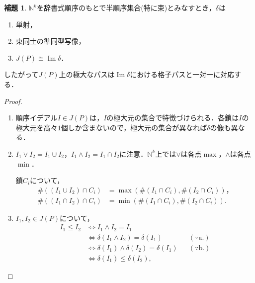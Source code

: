 \documentclass[xelatex,ja=standard,a4paper,14pt,everyparhook=compat]{bxjsarticle}
\newcommand{\bbN}{\mathbb{N}}
\DeclareMathOperator{\image}{Im}
\theoremstyle{definition}
\newtheorem*{lemma*}{補題}
\begin{document}
\begin{lemma*}
    $\bbN^k$を辞書式順序のもとで半順序集合(特に束)とみなすとき，$\delta$は \begin{enumerate}
        \item 単射，
        \item 束同士の準同型写像，
        \item $J(P) \cong \image \delta$．
    \end{enumerate}
    したがって$J(P)$上の極大なパスは$\image \delta$における格子パスと一対一に対応する．
\end{lemma*}
\begin{proof}
    \begin{enumerate}
        \item 順序イデアル$I \in J(P)$は，$I$の極大元の集合で特徴づけられる．各鎖は$I$の極大元を高々$1$個しか含まないので，極大元の集合が異なれば$\delta$の像も異なる．
        \item $I_1 \lor I_2 = I_1 \cup I_2$，$I_1 \land I_2 = I_1 \cap I_2$に注意．$\bbN^k$上では$\lor$は各点$\max$，$\land$は各点$\min$．

              鎖$C_i$について， \begin{align*}
                  \#((I_1 \cup I_2) \cap C_i) & = \max(\#(I_1 \cap C_i), \#(I_2 \cap C_i))， \\
                  \#((I_1 \cap I_2) \cap C_i) & = \min(\#(I_1 \cap C_i), \#(I_2 \cap C_i)).
              \end{align*}
        \item $I_1, I_2 \in J(P)$について， \begin{align*}
                  I_1 \leq I_2
                   & \Longleftrightarrow I_1 \land I_2 = I_1                                                   \\
                   & \Longleftrightarrow \delta(I_1 \land I_2) = \delta(I_1)         &  & (\because \text{a.}) \\
                   & \Longleftrightarrow \delta(I_1) \land \delta(I_2) = \delta(I_1) &  & (\because \text{b.}) \\
                   & \Longleftrightarrow \delta(I_1) \leq \delta(I_2),
              \end{align*}
    \end{enumerate}
\end{proof}
\end{document}
